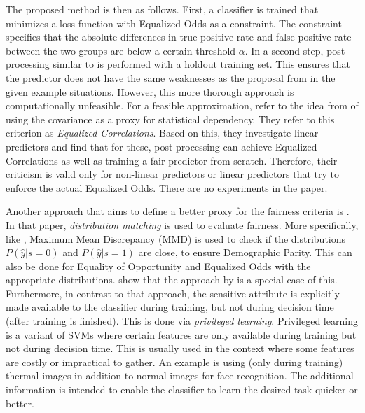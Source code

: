 The proposed method is then as follows.
First, a classifier is trained that minimizes a loss function with Equalized Odds as a constraint.
The constraint specifies that the absolute differences in true positive rate and false positive rate
between the two groups are below a certain threshold \(\alpha\).
In a second step, post-processing similar to \citet{hardt2016equality} is performed with a holdout training set.
This ensures that the predictor does not have the same weaknesses
as the proposal from \citet{hardt2016equality} in the given example situations.
However, this more thorough approach is computationally unfeasible.
For a feasible approximation, \citet{woodworth2017learning} refer to the idea from \citet{zafar2017fairnesstreatment}
of using the covariance as a proxy for statistical dependency.
They refer to this criterion as \emph{Equalized Correlations}.
Based on this, they investigate linear predictors and find that for these,
post-processing can achieve Equalized Correlations as well as training a fair predictor from scratch.
Therefore, their criticism is valid only for non-linear predictors
or linear predictors that try to enforce the actual Equalized Odds.
There are no experiments in the paper.

Another approach that aims to define a better proxy for the fairness criteria is \citet{quadrianto2017recycling}.
In that paper, \emph{distribution matching} is used to evaluate fairness.
More specifically, like \citet{louizos2016variational}, Maximum Mean Discrepancy (MMD) is used to check
if the distributions \(P(\hat{y}|s=0)\) and \(P(\hat{y}|s=1)\) are close, to ensure Demographic Parity.
This can also be done for Equality of Opportunity and Equalized Odds with the appropriate distributions.
\citet{quadrianto2017recycling} show that the approach by \citet{zafar2017fairnessconstraints} is a special case of this.
Furthermore, in contrast to that approach,
the sensitive attribute is explicitly made available to the classifier during training,
but not during decision time (after training is finished).
This is done via \emph{privileged learning}.
Privileged learning is a variant of \acp{SVM}
where certain features are only available during training but not during decision time.
This is usually used in the context where some features are costly or impractical to gather.
An example is using (only during training) thermal images in addition to normal images for face recognition.
The additional information is intended to enable the classifier to learn the desired task quicker or better.

